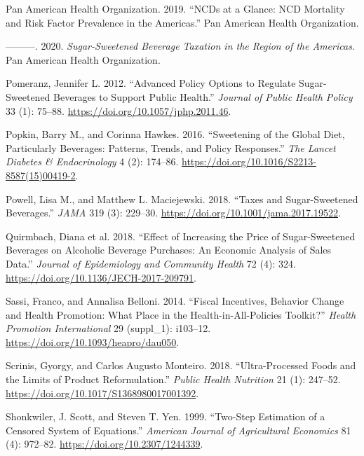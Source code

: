 \documentclass[
  11pt,
]{article}
\newlength{\cslhangindent}
\newenvironment{CSLReferences}[2] %
 {\begin{list}{}{%
  \setlength{\itemindent}{0pt}
  \setlength{\leftmargin}{0pt}
  \setlength{\parsep}{0pt}
  \ifodd #1
   \setlength{\leftmargin}{\cslhangindent}
   \setlength{\itemindent}{-1\cslhangindent}
  \fi
  \setlength{\itemsep}{#2\baselineskip}}}
 {\end{list}}
\begin{document}
\begin{CSLReferences}{1}{0}
Pan American Health Organization. 2019. {``{NCDs} at a Glance: {NCD}
Mortality and Risk Factor Prevalence in the Americas.''} Pan American
Health Organization.

---------. 2020. \emph{Sugar-Sweetened Beverage Taxation in the Region
of the Americas}. Pan American Health Organization.

Pomeranz, Jennifer L. 2012. {``Advanced Policy Options to Regulate
Sugar-Sweetened Beverages to Support Public Health.''} \emph{Journal of
Public Health Policy} 33 (1): 75--88.
\url{https://doi.org/10.1057/jphp.2011.46}.

Popkin, Barry M., and Corinna Hawkes. 2016. {``Sweetening of the Global
Diet, Particularly Beverages: Patterns, Trends, and Policy Responses.''}
\emph{The Lancet Diabetes \& Endocrinology} 4 (2): 174--86.
\url{https://doi.org/10.1016/S2213-8587(15)00419-2}.

Powell, Lisa M., and Matthew L. Maciejewski. 2018. {``Taxes and
Sugar-Sweetened Beverages.''} \emph{JAMA} 319 (3): 229--30.
\url{https://doi.org/10.1001/jama.2017.19522}.

Quirmbach, Diana et al. 2018. {``Effect of Increasing the Price of
Sugar-Sweetened Beverages on Alcoholic Beverage Purchases: An Economic
Analysis of Sales Data.''} \emph{Journal of Epidemiology and Community
Health} 72 (4): 324. \url{https://doi.org/10.1136/JECH-2017-209791}.

Sassi, Franco, and Annalisa Belloni. 2014. {``Fiscal Incentives,
Behavior Change and Health Promotion: What Place in the
Health-in-All-Policies Toolkit?''} \emph{Health Promotion International}
29 (suppl\_1): i103--12. \url{https://doi.org/10.1093/heapro/dau050}.

Scrinis, Gyorgy, and Carlos Augusto Monteiro. 2018. {``Ultra-Processed
Foods and the Limits of Product Reformulation.''} \emph{Public Health
Nutrition} 21 (1): 247--52.
\url{https://doi.org/10.1017/S1368980017001392}.

Shonkwiler, J. Scott, and Steven T. Yen. 1999. {``Two-Step Estimation of
a Censored System of Equations.''} \emph{American Journal of
Agricultural Economics} 81 (4): 972--82.
\url{https://doi.org/10.2307/1244339}.


\end{CSLReferences}
\end{document}
